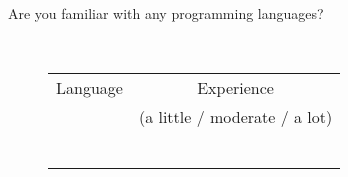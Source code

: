 \documentclass{article}
\begin{document}
\begin{description}
\item [Are you familiar with any programming languages?]  \hfill \\
\begin{tabular}{cc}
Language & Experience \\
 & (a little / moderate / a lot) \\ \\
\underline{\hspace{5cm}} & \underline{\hspace{5cm}} \\ \\
\underline{\hspace{5cm}} & \underline{\hspace{5cm}} \\ \\
\underline{\hspace{5cm}} & \underline{\hspace{5cm}} 
\end{tabular}

\end{description}
\end{document}
